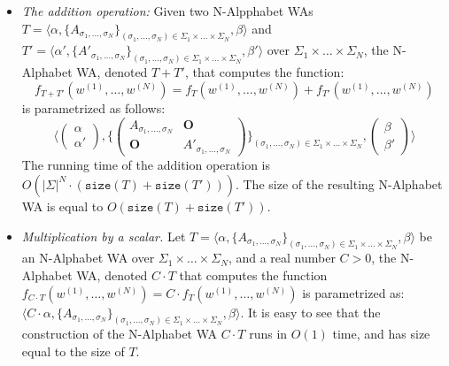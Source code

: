      \begin{itemize}
         \item \emph{The addition operation:} Given two N-Alpphabet WAs $T = \langle\alpha, \{A_{\sigma_{1},\ldots, \sigma_{N}}\}_{(\sigma_{1}, \ldots, \sigma_{N}) \in \Sigma_{1} \times \ldots \times \Sigma_{N}}, \beta\rangle$ and $T' = \langle\alpha', \{A'_{\sigma_{1},\ldots, \sigma_{N}}\}_{(\sigma_{1}, \ldots, \sigma_{N}) \in \Sigma_{1} \times \ldots \times \Sigma_{N}}, \beta'\rangle$  over $\Sigma_{1} \times \ldots \times \Sigma_{N}$, the N-Alphabet WA, denoted $T + T'$, that computes the function:
         $$f_{T + T'}(w^{(1)}, \ldots, w^{(N)}) = f_{T}(w^{(1)}, \ldots, w^{(N)}) + f_{T'}(w^{(1)}, \ldots, w^{(N)})$$
         is parametrized as follows:
          $$\langle\begin{pmatrix}
              \alpha \\ \alpha'
          \end{pmatrix} , \{\begin{pmatrix}
               A_{\sigma_{1}, \ldots , \sigma_{N}} & \mathbf{O} \\
               \mathbf{O} & A'_{\sigma_{1}, \ldots, \sigma_{N}}
          \end{pmatrix} \}_{(\sigma_{1}, \ldots, \sigma_{N}) \in \Sigma_{1} \times \ldots \times \Sigma_{N}}, \begin{pmatrix}
              \beta \\ \beta' 
          \end{pmatrix} \rangle$$
          The running time of the addition operation is $O(|\Sigma|^{N} \cdot (\texttt{size}(T) + \texttt{size}(T') ))$. The size of the resulting N-Alphabet WA is equal to $O(\texttt{size}(T) + \texttt{size}(T'))$.
          \item \emph{Multiplication by a scalar.} Let $T = \langle\alpha, \{A_{\sigma_{1},\ldots,\sigma_{N}}\}_{(\sigma_{1}, \ldots, \sigma_{N}) \in \Sigma_{1} \times \ldots \times \Sigma_{N}}, \beta\rangle$ be an N-Alphabet WA over $\Sigma_{1} \times \ldots \times \Sigma_{N}$, and a real number $C> 0$, the N-Alphabet WA, denoted $C \cdot T$ that computes the function $f_{C \cdot T}(w^{(1)}, \ldots, w^{(N)}) = C \cdot f_{T}(w^{(1)}, \ldots, w^{(N)})$ is parametrized as: $\langle C \cdot \alpha, \{ A_{\sigma_{1},  \ldots, \sigma_{N}}\}_{(\sigma_{1}, \ldots, \sigma_{N}) \in \Sigma_{1} \times \ldots \times \Sigma_{N}}, \beta \rangle$. It is easy to see that the construction of the N-Alphabet WA $C \cdot T$ runs in $O(1)$ time, and has size equal to the size of $T$. 
     \end{itemize}
